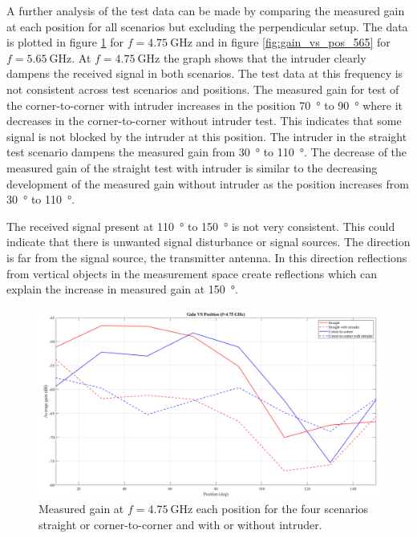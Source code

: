 A further analysis of the test data can be made by comparing the measured gain at each position for all scenarios but excluding the perpendicular setup. The data is plotted in figure \ref{fig:gain_vs_pos_475} for $f=\SI{4.75}{\giga\hertz}$ and in figure \ref{fig:gain_vs_pos_565} for $f=\SI{5.65}{\giga\hertz}$. At $f=\SI{4.75}{\giga\hertz}$ the graph shows that the intruder clearly dampens the received signal in both scenarios. The test data at this frequency is not consistent across test scenarios and positions. The measured gain for test of the corner-to-corner with intruder increases in the position \SI{70}{\degree} to \SI{90}{\degree} where  it decreases in the corner-to-corner without intruder test. This indicates that some signal is not blocked by the intruder at this position. The intruder in the straight test scenario dampens the measured gain from \SI{30}{\degree} to \SI{110}{\degree}. The decrease of the measured gain of the straight test with intruder is similar to the decreasing development of the measured gain without intruder as the position increases from \SI{30}{\degree} to \SI{110}{\degree}. 

The received signal present at \SI{110}{\degree} to \SI{150}{\degree} is not very consistent. This could indicate that there is unwanted signal disturbance or signal sources. The direction is far from the signal source, the transmitter antenna. In this direction reflections from vertical objects in the measurement space create reflections which can explain the increase in measured gain at \SI{150}{\degree}.

\begin{figure}[H]
    \centering
    \includegraphics[width=1\textwidth]{figures/gain_vs_pos_475.png}
    \caption{Measured gain at $f=\SI{4.75}{\giga\hertz}$ each position for the four scenarios straight or corner-to-corner and with or without intruder.} 
    \label{fig:gain_vs_pos_475}
\end{figure}

